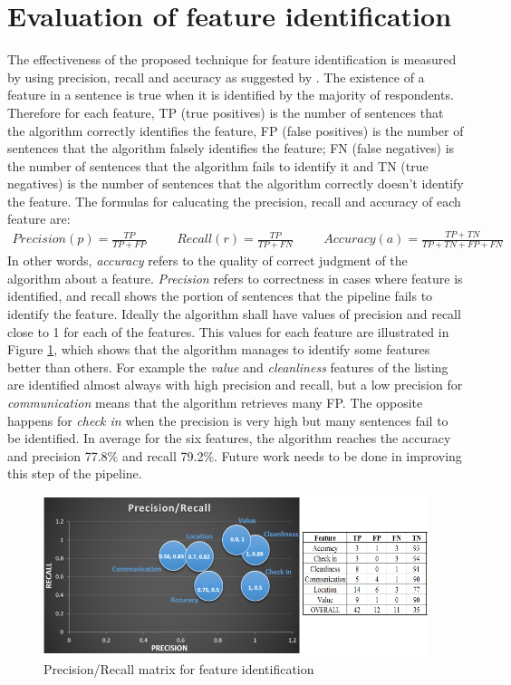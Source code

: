 \section{Evaluation of feature identification}
The effectiveness of the proposed technique for feature identification is measured by using precision, recall and accuracy as suggested by \cite{huang2006performance}.
The existence of a feature in a sentence is true when it is identified by the majority of respondents. Therefore for each feature, TP (true positives) is the number of sentences that the algorithm correctly identifies the feature, FP (false positives) is the number of sentences that the algorithm falsely identifies the feature; FN (false negatives) is the number of sentences that the algorithm fails to identify it and TN (true negatives) is the number of sentences that the algorithm correctly doesn't identify the feature. The formulas for calucating the precision, recall and accuracy of each feature are:
\begin{align}
Precision  (p) =\frac{TP}{TP+FP} \hspace{1cm}
Recall  (r) = \frac{TP}{TP + FN} \hspace{1cm}
Accuracy (a) = \frac{TP + TN}{TP+TN+FP+FN}
\end{align}
In other words, \textit{accuracy} refers to the quality of correct judgment of the algorithm about a feature.  \textit{Precision} refers to correctness in cases where feature is identified, and recall shows the portion of sentences that the pipeline fails to identify the feature. Ideally the algorithm shall have values of precision and recall close to 1 for each of the features.
This values for each feature are illustrated in Figure \ref{fig:matrix}, which shows that the algorithm manages to identify some features better than others. For example the \textit{value} and \textit{cleanliness} features of the listing are identified almost always with high precision and recall, but a low precision for \textit{communication} means that the algorithm retrieves many FP. The opposite happens for \textit{check in} when the precision is very high but many sentences fail to be identified. In average for the six features, the algorithm reaches the accuracy and precision 77.8\% and recall 79.2\%. Future work needs to be done in improving this step of the pipeline.
\begin{figure}[h!]
	\centering
	\includegraphics[height=0.3\textheight]{PR_table}
	\caption{Precision/Recall matrix for feature identification}
	\label{fig:matrix}
\end{figure}